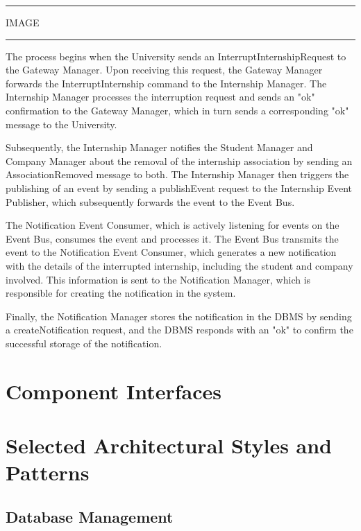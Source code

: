 \vspace{20pt}
\hrule
\vspace{10pt}
IMAGE
\vspace{10pt}
\hrule
\vspace{20pt}

The process begins when the University sends an InterruptInternshipRequest to the Gateway Manager. Upon receiving this request, the Gateway Manager forwards the InterruptInternship command to the Internship Manager. The Internship Manager processes the interruption request and sends an "ok" confirmation to the Gateway Manager, which in turn sends a corresponding "ok" message to the University.

Subsequently, the Internship Manager notifies the Student Manager and Company Manager about the removal of the internship association by sending an AssociationRemoved message to both. The Internship Manager then triggers the publishing of an event by sending a publishEvent request to the Internship Event Publisher, which subsequently forwards the event to the Event Bus.

The Notification Event Consumer, which is actively listening for events on the Event Bus, consumes the event and processes it. The Event Bus transmits the event to the Notification Event Consumer, which generates a new notification with the details of the interrupted internship, including the student and company involved. This information is sent to the Notification Manager, which is responsible for creating the notification in the system.

Finally, the Notification Manager stores the notification in the DBMS by sending a createNotification request, and the DBMS responds with an "ok" to confirm the successful storage of the notification.

\section{Component Interfaces}



\section{Selected Architectural Styles and Patterns}
\subsection{Database Management}
